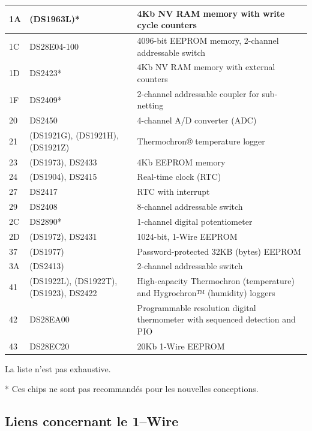 \begin{center}
\begin{tabular}{|p{}|p{}|p{}|}
1A & (DS1963L)*                           & 4Kb NV RAM memory with write cycle counters \\ \hline
1C & DS28E04-100                          & 4096-bit EEPROM memory, 2-channel addressable switch \\ \hline
1D & DS2423*                              & 4Kb NV RAM memory with external counters \\ \hline
1F & DS2409*                              & 2-channel addressable coupler for sub-netting \\ \hline
20 & DS2450                               & 4-channel A/D converter (ADC) \\ \hline
21 & (DS1921G), (DS1921H), (DS1921Z)      & Thermochron® temperature logger \\ \hline
23 & (DS1973), DS2433                     & 4Kb EEPROM memory \\ \hline
24 & (DS1904), DS2415                     & Real-time clock (RTC) \\ \hline
27 & DS2417                               & RTC with interrupt \\ \hline
29 & DS2408                               & 8-channel addressable switch \\ \hline
2C & DS2890*                              & 1-channel digital potentiometer \\ \hline
2D & (DS1972), DS2431                     & 1024-bit, 1-Wire EEPROM \\ \hline
37 & (DS1977)                             & Password-protected 32KB (bytes) EEPROM \\ \hline
3A & (DS2413)                             & 2-channel addressable switch \\ \hline
41 & (DS1922L), (DS1922T), (DS1923), DS2422 & \raggedright High-capacity Thermochron (temperature) and Hygrochron™ (humidity) loggers \tabularnewline \hline
42 & DS28EA00                             & \raggedright Programmable resolution digital thermometer with sequenced detection and PIO \tabularnewline \hline
43 & DS28EC20                             & 20Kb 1-Wire EEPROM \\ \hline
\end{tabular}
\end{center}

La liste n'est pas exhaustive.

* Ces chips ne sont pas recommandés pour les nouvelles conceptions.

\subsection{Liens concernant le 1--Wire}

